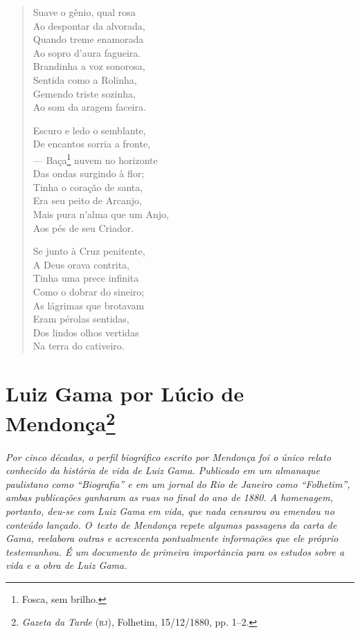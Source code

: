 \begin{verse}
Suave o gênio, qual rosa\\
Ao despontar da alvorada,\\
Quando treme enamorada\\
Ao sopro d'aura fagueira.\\
Brandinha a voz sonorosa,\\
Sentida como a Rolinha,\\
Gemendo triste sozinha,\\
Ao som da aragem faceira.

Escuro e ledo o semblante,\\
De encantos sorria a fronte,\\
--- Baça\footnote{Fosca, sem brilho.} nuvem no horizonte\\
Das ondas surgindo à flor;\\
Tinha o coração de santa,\\
Era seu peito de Arcanjo,\\
Mais pura n'alma que um Anjo,\\
Aos pés de seu Criador.

Se junto à Cruz penitente,\\
A Deus orava contrita,\\
Tinha uma prece infinita\\
Como o dobrar do sineiro;\\
As lágrimas que brotavam\\
Eram pérolas sentidas,\\
Dos lindos olhos vertidas\\
Na terra do cativeiro.
\end{verse}


\chapter{Luiz Gama por Lúcio de Mendonça\footnote{
\emph{Gazeta da Tarde} (\textsc{rj}), Folhetim, 15/12/1880, pp. 1--2.}}

\begin{resumo}
\emph{Por cinco décadas, o perfil biográfico escrito por Mendonça foi o
único relato conhecido da história de vida de Luiz Gama. Publicado em um
almanaque paulistano como ``Biografia'' e em um jornal do Rio de Janeiro
como ``Folhetim'', ambas publicações ganharam as ruas no final do ano de
1880. A homenagem, portanto, deu-se com Luiz Gama em vida, que nada
censurou ou emendou no conteúdo lançado. O~texto de Mendonça repete
algumas passagens da carta de Gama, reelabora outras e acrescenta
pontualmente informações que ele próprio testemunhou. É um documento de
primeira importância para os estudos sobre a vida e a obra de Luiz Gama.
}
\end{resumo}

